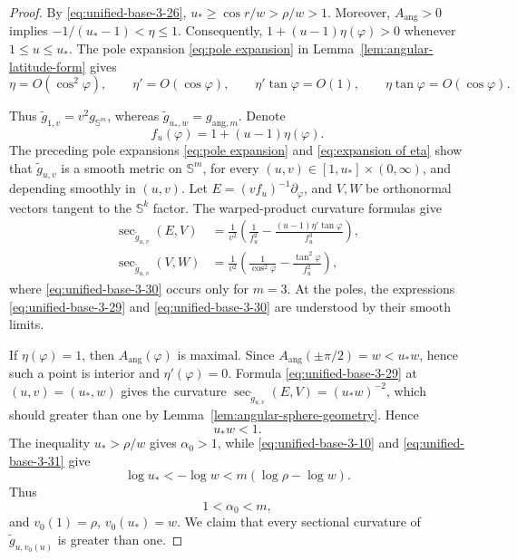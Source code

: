 \documentclass[11pt,reqno]{amsart}
\theoremstyle{definition}
\numberwithin{equation}{section}
\begin{document}
\begin{proof}
By \eqref{eq:unified-base-3-26},
$u_*\ge \cos r/w>\rho/w>1$.  Moreover,
$A_{\mathrm{ang}}>0$ implies
$-1/(u_*-1)<\eta\le1$.  Consequently,
$1+(u-1)\eta(\varphi)>0$ whenever $1\le u\le u_*$.
The pole expansion \eqref{eq:pole expansion} in
Lemma~\ref{lem:angular-latitude-form} gives
\begin{equation}\label{eq:expansion of eta}
 \eta=O(\cos^2\varphi),\qquad
 \eta'=O(\cos\varphi),\qquad
 \eta'\tan\varphi=O(1),\qquad
 \eta\tan\varphi=O(\cos\varphi).
\end{equation}



Thus $\widetilde g_{1,v}=v^2g_{\mathbb S^m}$, whereas
$\widetilde g_{u_*,w}=g_{\mathrm{ang},m}$.  Denote
\[
 f_u(\varphi)=1+(u-1)\eta(\varphi).
\]
The preceding pole expansions \eqref{eq:pole expansion} and \eqref{eq:expansion of eta} show that
\(\widetilde g_{u,v}\) is a smooth metric on \(\mathbb S^m\), for
every \((u,v)\in[1,u_*]\times(0,\infty)\), and depending
smoothly in \((u,v)\).
Let $E=(vf_u)^{-1}\partial_\varphi$, and $V,W$ be orthonormal
vectors tangent to the $\mathbb S^k$ factor.  The warped-product
curvature formulas give
\begin{align}
 \sec_{\widetilde g_{u,v}}(E,V)
 &=\frac1{v^2}\left(
      \frac1{f_u^2}
      -\frac{(u-1)\eta'\tan\varphi}{f_u^3}\right),                \label{eq:unified-base-3-29}\\
 \sec_{\widetilde g_{u,v}}(V,W)
 &=\frac1{v^2}\left(
      \frac1{\cos^2\varphi}
      -\frac{\tan^2\varphi}{f_u^2}\right),                       \label{eq:unified-base-3-30}
\end{align}
where \eqref{eq:unified-base-3-30} occurs only for $m=3$.  At the
poles, the expressions \eqref{eq:unified-base-3-29} and \eqref{eq:unified-base-3-30} are understood by their smooth limits.

If $\eta(\varphi)=1$, then
$A_{\mathrm{ang}}(\varphi)$ is maximal.  Since
$A_{\mathrm{ang}}(\pm\pi/2)=w<u_*w$, hence such a point is interior and
$\eta'(\varphi)=0$.  Formula \eqref{eq:unified-base-3-29} at
$(u,v)=(u_*,w)$ gives the curvature $\sec_{\widetilde g_{u,v}}(E,V)=(u_*w)^{-2}$, which should greater
than one by Lemma~\ref{lem:angular-sphere-geometry}.  Hence
\begin{equation}
u_*w<1.                              \label{eq:unified-base-3-31}
\end{equation}
The inequality $u_*>\rho/w$ gives $\alpha_0>1$, while
\eqref{eq:unified-base-3-10} and \eqref{eq:unified-base-3-31} give
\[
 \log u_*<-\log w<m(\log\rho-\log w).
\]
Thus
\begin{equation}
1<\alpha_0<m,                        \label{eq:unified-base-3-33}
\end{equation}
and $v_0(1)=\rho$, $v_0(u_*)=w$.  We claim that every sectional
curvature of $\widetilde g_{u,v_0(u)}$ is greater than one.


\end{proof}
\end{document}
